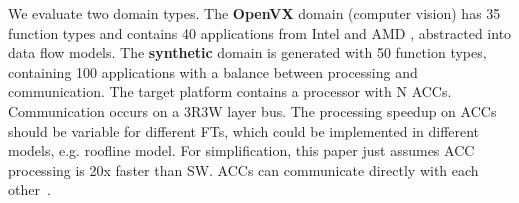 We evaluate two domain types. The \textbf{OpenVX} domain (computer vision) has 35 function types and contains 40 applications from Intel \cite{Intel} and AMD \cite{AMD}, abstracted into data flow models. The \textbf{synthetic} domain is generated with 50 function types, containing 100 applications with a balance between processing and communication. 
The target platform contains a processor with N ACCs. Communication occurs on a 3R3W layer bus. The processing speedup on ACCs should be variable for different FTs, which could be implemented in different models, e.g. roofline model. For simplification, this paper just assumes ACC processing is 20x faster than SW. ACCs can communicate directly with each other~\cite{teimouri2016improving}.
